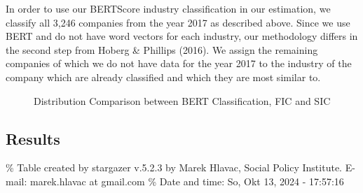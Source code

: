 \documentclass[
]{article}
\begin{document}
In order to use our BERTScore industry classification in our estimation,
we classify all 3,246 companies from the year 2017 as described above.
Since we use BERT and do not have word vectors for each industry, our
methodology differs in the second step from Hoberg \& Phillips (2016).
We assign the remaining companies of which we do not have data for the
year 2017 to the industry of the company which are already classified
and which they are most similar to.

\begin{figure}


\caption{\label{fig-2}Distribution Comparison between BERT
Classification, FIC and SIC}

\end{figure}%

\subsection{Results}\label{results}

\% Table created by stargazer v.5.2.3 by Marek Hlavac, Social Policy
Institute. E-mail: marek.hlavac at gmail.com \% Date and time: So, Okt
13, 2024 - 17:57:16
\end{document}
